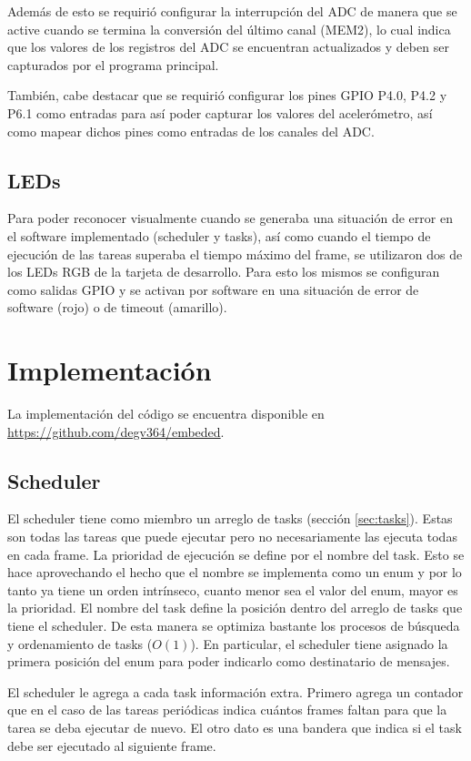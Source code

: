 Además de esto se requirió configurar la interrupción del ADC de manera que se
active cuando se termina la conversión del último canal (MEM2), lo cual indica
que los valores de los registros del ADC se encuentran actualizados y deben ser
capturados por el programa principal.

También, cabe destacar que se requirió configurar los pines GPIO P4.0, P4.2 y P6.1
como entradas para así poder capturar los valores del acelerómetro, así como
mapear dichos pines como entradas de los canales del ADC.

\subsection{LEDs}
Para poder reconocer visualmente cuando se generaba una situación de error en el
software implementado (scheduler y tasks), así como cuando el tiempo de
ejecución de las tareas superaba el tiempo máximo del frame, se utilizaron dos
de los LEDs RGB de la tarjeta de desarrollo. Para esto los mismos se configuran
como salidas GPIO y se activan por software en una situación de error de
software (rojo) o de timeout (amarillo).

\section{Implementación}
La implementación del código se encuentra disponible en
\url{https://github.com/degv364/embeded}.

\subsection{Scheduler}
\label{sec:scheduler}
El scheduler tiene como miembro un arreglo de tasks (sección \ref{sec:tasks}).
Estas son todas las tareas que puede ejecutar pero no necesariamente las ejecuta
todas en cada frame. La prioridad de ejecución se define por el nombre del task.
Esto se hace aprovechando el hecho que el nombre se implementa como un enum y
por lo tanto ya tiene un orden intrínseco, cuanto menor sea el valor del enum,
mayor es la prioridad. El nombre del task define la posición dentro del arreglo
de tasks que tiene el scheduler. De esta manera se optimiza bastante los
procesos de búsqueda y ordenamiento de tasks ($O(1)$). En particular, el
scheduler tiene asignado la primera posición del enum para poder indicarlo como
destinatario de mensajes.

El scheduler le agrega a cada task información extra. Primero agrega un contador
que en el caso de las tareas periódicas indica cuántos frames faltan para que la
tarea se deba ejecutar de nuevo. El otro dato es una bandera que indica si el
task debe ser ejecutado al siguiente frame.

